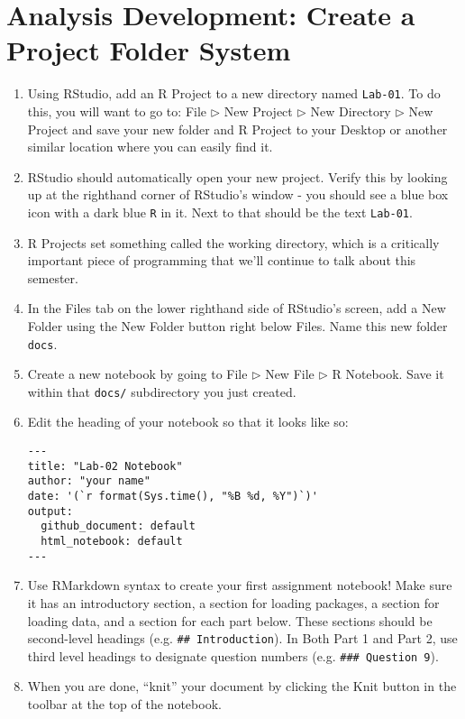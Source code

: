 \documentclass{tufte-handout}
\begin{document}
\section{Analysis Development: Create a Project Folder System}
\begin{enumerate}
\item Using RStudio, add an R Project to a new directory named \texttt{Lab-01}. To do this, you will want to go to: \textsf{File $\triangleright$} {\color{red}\textsf{New Project}} \textsf{$\triangleright$ New Directory $\triangleright$ New Project} and save your new folder and R Project to your Desktop or another similar location where you can easily find it.
\item RStudio should automatically open your new project. Verify this by looking up at the righthand corner of RStudio's window - you should see a blue box icon with a dark blue \texttt{R} in it. Next to that should be the text \texttt{Lab-01}.
\item R Projects set something called the working directory, which is a critically important piece of programming that we'll continue to talk about this semester.
\item In the \textsf{Files} tab on the lower righthand side of RStudio's screen, add a New Folder using the \textsf{New Folder} button right below \textsf{Files}. Name this new folder \texttt{docs}.
\item Create a new notebook by going to \textsf{File $\triangleright$ New File $\triangleright$} {\color{red}\textsf{R Notebook}}. Save it within that \texttt{docs/} subdirectory you just created.
\item Edit the heading of your notebook so that it looks like so: \\
\begin{verbatim}
---
title: "Lab-02 Notebook"
author: "your name"
date: '(`r format(Sys.time(), "%B %d, %Y")`)'
output: 
  github_document: default
  html_notebook: default 
---
\end{verbatim}
\item Use RMarkdown syntax to create your first assignment notebook! Make sure it has an introductory section, a section for loading packages, a section for loading data, and a section for each part below. These sections should be second-level headings (e.g. \texttt{\#\# Introduction}). In Both Part 1 and Part 2, use third level headings to designate question numbers (e.g. \texttt{\#\#\# Question 9}).
\item When you are done, ``knit'' your document by clicking the \textsf{Knit} button in the toolbar at the top of the notebook.
\end{enumerate}
\end{document}
